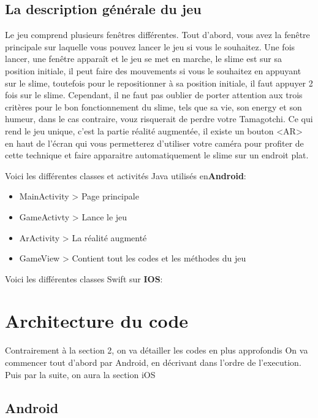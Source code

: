 \documentclass{article}
\begin{document}
\subsection{La description générale du jeu}

Le jeu comprend plusieurs fenêtres différentes. Tout d’abord, vous avez la fenêtre principale sur laquelle vous pouvez lancer le jeu si vous le souhaitez. Une fois lancer, une fenêtre apparaît et le jeu se met en marche, le slime est sur sa position initiale, il peut faire des mouvements si vous le souhaitez en appuyant sur le slime, toutefois pour le repositionner à sa position initiale, il faut appuyer 2 fois sur le slime. Cependant, il ne faut pas oublier de porter attention aux trois critères pour le bon fonctionnement du slime, tels que sa vie, son energy et son humeur, dans le cas contraire, vouz risquerait de perdre votre Tamagotchi.
Ce qui rend le jeu unique, c'est la partie réalité augmentée, il existe un bouton <AR> en haut de l'écran qui vous permetterez d'utiliser votre caméra pour profiter de cette technique et faire apparaitre automatiquement le slime sur un endroit plat.


\newpage
Voici les différentes classes et activités Java utilisés en\textbf{Android}:
\begin{itemize}

\medskip
\item MainActivity > Page principale
\item GameActivty > Lance le jeu
\item ArActivity > La réalité augmenté
\item GameView > Contient tout les codes et les méthodes du jeu
\end{itemize}

\medskip

Voici les différentes classes Swift sur \textbf{IOS}:
\medskip


\section{Architecture du code}

Contrairement à la section 2, on va détailler les codes en plus approfondis On va commencer tout d’abord par Android, en décrivant dans l’ordre de l’execution. Puis par la suite, on aura la section iOS

\subsection{Android}
\end{document}
